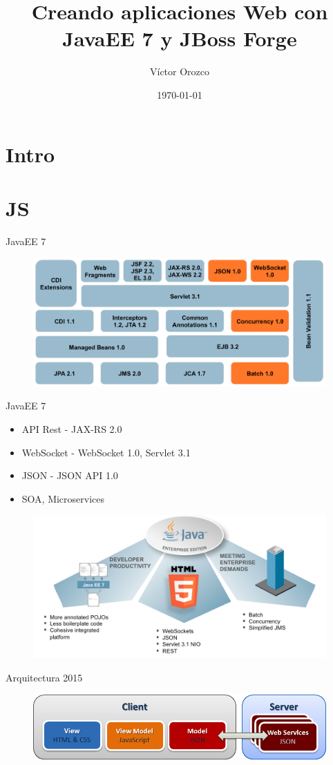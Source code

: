 \documentclass{beamer}
\title{Creando aplicaciones Web con JavaEE 7 y JBoss Forge}
\author{Víctor Orozco}
\institute{Nabenik}
\date{\today}
\begin{document}
\frame{\titlepage}

\section{Intro}

\section{JS}

\begin{frame}{JavaEE 7}
	\begin{figure}
		\centering
		\includegraphics[width=0.9\linewidth]{Images/javaee7-pancake.png}
	\end{figure}	
\end{frame}

\begin{frame}{JavaEE 7}
	\begin{itemize}
		\item API Rest - JAX-RS 2.0
		\item WebSocket - WebSocket 1.0, Servlet 3.1
		\item JSON - JSON API 1.0
		\item SOA, Microservices
	\end{itemize}
	\begin{figure}
		\centering
		\includegraphics[width=0.7\linewidth]{Images/javaee7-theme}
	\end{figure}
\end{frame}

\begin{frame}{Arquitectura 2015}
	\begin{figure}
\centering
\includegraphics[width=0.9\linewidth]{Images/arq2015b}
\end{figure}
\end{frame}
\end{document}
